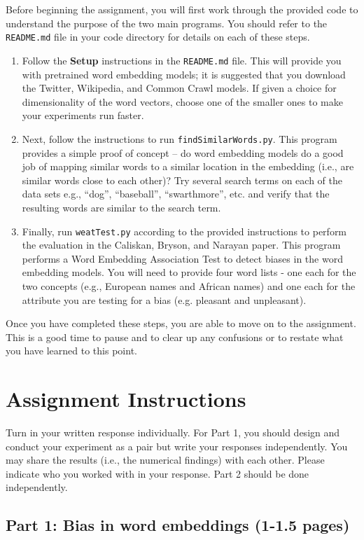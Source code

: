 \documentclass[11pt, letterpaper]{article}
\begin{document}
Before beginning the assignment, you will first work through the provided code to understand the purpose of the two main programs.  You should refer to the {\tt README.md} file in your code
directory for details on each of these steps.
\begin{enumerate}
  \item Follow the {\bf Setup} instructions in the {\tt README.md} file.  This will provide you with pretrained word embedding models; it is suggested that you download the Twitter, Wikipedia, and Common Crawl models.  If given a choice for dimensionality of the word vectors, choose
  one of the smaller ones to make your experiments run faster.
  \item Next, follow the instructions to run {\tt findSimilarWords.py}.
  This program provides a simple proof of concept -- do word embedding models
  do a good job of mapping similar words to a similar location in the embedding (i.e., are similar words close to each other)? Try several search terms on each of the data sets e.g.,
  ``dog'', ``baseball'', ``swarthmore'', etc. and verify that the resulting words are
  similar to the search term.
  \item Finally, run {\tt weatTest.py} according to the provided instructions
  to perform the evaluation in the Caliskan, Bryson, and Narayan paper.  This program performs a Word Embedding Association Test to detect biases in the word embedding models.  You will
  need to provide four word lists - one each for the two concepts (e.g., European names
  and African names) and one each for the attribute you are testing for a bias (e.g. pleasant and unpleasant).
\end{enumerate}

Once you have completed these steps, you are able to move on to the assignment.
This is a good time to pause and to clear up any confusions or to restate what you
have learned to this point.

\section*{Assignment Instructions}

Turn in your written response individually.  For Part 1, you should design and conduct your experiment as a pair but write your responses independently.  You may share the results (i.e., the numerical findings) with each other.  Please indicate who you worked with in your response. Part 2 should be done independently.

\subsection*{Part 1: Bias in word embeddings (1-1.5 pages)}
\end{document}
